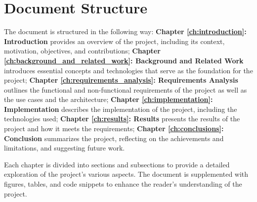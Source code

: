 \section{Document Structure}
\label{sec:document_structure}

The document is structured in the following way: \textbf{Chapter
    \ref{ch:introduction}: Introduction} provides an overview of the project,
including its context, motivation, objectives, and contributions;
\textbf{Chapter \ref{ch:background_and_related_work}: Background and Related
    Work} introduces essential concepts and technologies that serve as the
foundation for the project; \textbf{Chapter \ref{ch:requirements_analysis}:
    Requirements Analysis} outlines the functional and non-functional requirements
of the project as well as the use cases and the architecture; \textbf{Chapter
    \ref{ch:implementation}: Implementation} describes the implementation of the
project, including the technologies used; \textbf{Chapter \ref{ch:results}:
    Results} presents the results of the project and how it meets the requirements;
\textbf{Chapter \ref{ch:conclusions}: Conclusion} summarizes the project,
reflecting on the achievements and limitations, and suggesting future work.

Each chapter is divided into sections and subsections to provide a detailed
exploration of the project's various aspects. The document is supplemented with
figures, tables, and code snippets to enhance the reader's understanding of the
project.